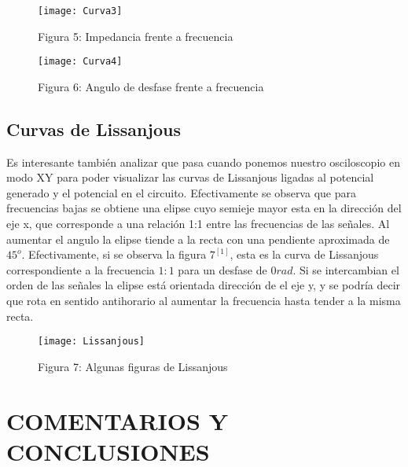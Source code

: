 \documentclass[article, 11pt]{report}
\begin{document}
\begin{figure}[H]
	\centering
	\begin{minipage}{.5\textwidth}
		\centering
		\texttt{[image: Curva3]}
		\caption*{Figura 5: Impedancia frente a frecuencia}
	\end{minipage}%
	\begin{minipage}{.5\textwidth}
		\centering
		\texttt{[image: Curva4]}
		\caption*{Figura 6: Angulo de desfase frente a frecuencia}
		
	\end{minipage}
\end{figure}



\subsection{Curvas de Lissanjous} 

Es interesante también analizar que pasa cuando ponemos nuestro osciloscopio en modo XY para poder visualizar las curvas de Lissanjous ligadas al potencial generado y el potencial en el circuito. Efectivamente se observa que para frecuencias bajas se obtiene una elipse cuyo semieje mayor esta en la dirección del eje x, que corresponde a una relación 1:1 entre las frecuencias de las señales. Al aumentar el angulo la elipse tiende a la recta con una pendiente aproximada de $45^o$. Efectivamente, si se observa la figura $7^{[1]}$, esta es la curva de Lissanjous correspondiente a la frecuencia $1:1$ para un desfase de $0 rad$. Si se intercambian el orden de las señales la elipse está orientada dirección de el eje y, y se podría decir que rota en sentido antihorario al aumentar la frecuencia hasta tender a la misma recta.


\begin{figure}[H]
	\centering
	\texttt{[image: Lissanjous]}
	\caption*{Figura 7: Algunas figuras de Lissanjous}
	
\end{figure}



\section{COMENTARIOS Y CONCLUSIONES}
\end{document}
